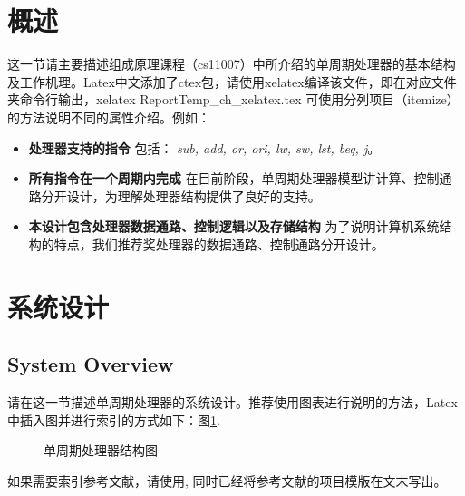 \documentclass[UTF8]{article}
\begin{document}

\section{概述} \label{overview}%
这一节请主要描述组成原理课程（cs11007）中所介绍的单周期处理器的基本结构及工作机理。Latex中文添加了ctex包，请使用xelatex编译该文件，即在对应文件夹命令行输出，xelatex ReportTemp\_ch\_xelatex.tex
可使用分列项目（itemize）的方法说明不同的属性介绍。例如：
\begin{itemize}
	\item{\textbf{处理器支持的指令} 包括： \emph{sub, add, or, ori, lw, sw, lst, beq, j}。}
    \item{\textbf{所有指令在一个周期内完成} 在目前阶段，单周期处理器模型讲计算、控制通路分开设计，为理解处理器结构提供了良好的支持。}
    \item{\textbf{本设计包含处理器数据通路、控制逻辑以及存储结构} 为了说明计算机系统结构的特点，我们推荐奖处理器的数据通路、控制通路分开设计。}
\end{itemize}


\newpage
\section{系统设计} \label{sysdes}%
\subsection{System Overview}\label{sub:sysover}
请在这一节描述单周期处理器的系统设计。推荐使用图表进行说明的方法，Latex中插入图并进行索引的方式如下：图\ref{fig:singleblock}. 
\begin{figure}[ht]
 \centering
 \caption{单周期处理器结构图}
 \label{fig:singleblock}
\end{figure}
如果需要索引参考文献，请使用\cite{Erdos01}, 同时已经将参考文献的项目模版在文末写出。
\end{document}
